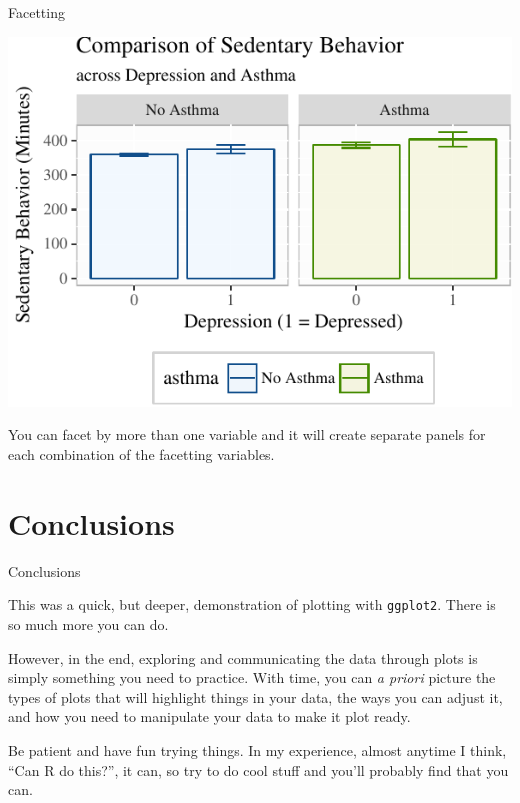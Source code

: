 \begin{frame}{Facetting}

\includegraphics{09_AdvancedPlotting_files/figure-beamer/f1-1.pdf}

You can facet by more than one variable and it will create separate
panels for each combination of the facetting variables.

\end{frame}

\section{Conclusions}\label{conclusions}

\begin{frame}[fragile]{Conclusions}

This was a quick, but deeper, demonstration of plotting with
\texttt{ggplot2}. There is so much more you can do.

However, in the end, exploring and communicating the data through plots
is simply something you need to practice. With time, you can \emph{a
priori} picture the types of plots that will highlight things in your
data, the ways you can adjust it, and how you need to manipulate your
data to make it plot ready.

Be patient and have fun trying things. In my experience, almost anytime
I think, ``Can R do this?'', it can, so try to do cool stuff and you'll
probably find that you can.

\end{frame}

